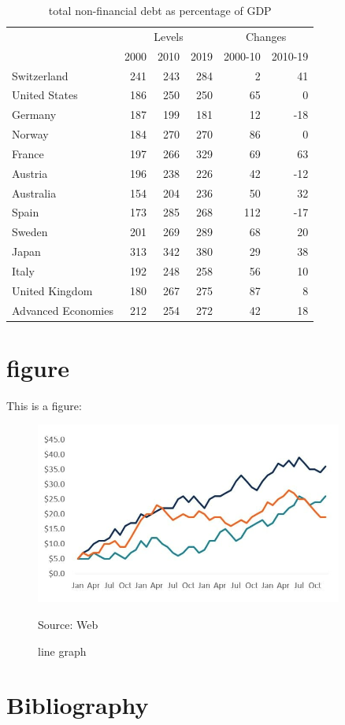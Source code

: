 \documentclass{article}
\begin{document}
\begin{table}[h]
	\centering
	\caption{total non-financial debt as percentage of GDP}
	\begin{tabular}{l|rrr|rr}
		\midrule
		\multicolumn{1}{r}{} & \multicolumn{3}{c|}{Levels} & \multicolumn{2}{c}{Changes} \\
		\cmidrule{2-6}    \multicolumn{1}{r}{} & \multicolumn{1}{c}{2000} & \multicolumn{1}{c}{2010} & \multicolumn{1}{c|}{2019} & \multicolumn{1}{c}{2000-10} & \multicolumn{1}{c}{2010-19} \\
		\midrule
		Switzerland & 241   & 243   & 284   & 2     & 41 \\
		United States & 186   & 250   & 250   & 65    & 0 \\
		Germany & 187   & 199   & 181   & 12    & -18 \\
		Norway & 184   & 270   & 270   & 86    & 0 \\
		France & 197   & 266   & 329   & 69    & 63 \\
		Austria & 196   & 238   & 226   & 42    & -12 \\
		Australia & 154   & 204   & 236   & 50    & 32 \\
		Spain & 173   & 285   & 268   & 112   & -17 \\
		Sweden & 201   & 269   & 289   & 68    & 20 \\
		Japan & 313   & 342   & 380   & 29    & 38 \\
		Italy & 192   & 248   & 258   & 56    & 10 \\
		United Kingdom & 180   & 267   & 275   & 87    & 8 \\
		\midrule
		Advanced Economies\footnotemark[2] & 212   & 254   & 272   & 42    & 18 \\
			\end{tabular}%
	\label{tab:total non financial debt as percentage of GDP}%
\end{table}%

\newpage

\section{figure}
This is a figure:

\begin{figure}[h]
	\centering
	\includegraphics[width=0.9\textwidth]{line-graph.jpg}
	\caption{line graph}
	{Source: Web}
	\label{fig:basicgrowthreg}
\end{figure}



\section{Bibliography}
\printbibliography
\end{document}
